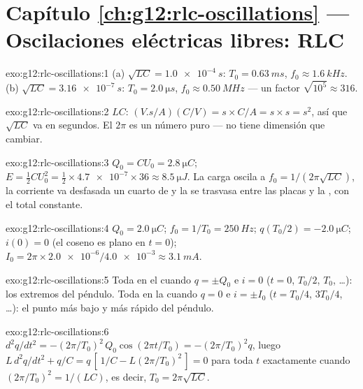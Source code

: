 \section*{Capítulo \ref{ch:g12:rlc-oscillations} --- Oscilaciones eléctricas libres: RLC}

\begin{solution}{exo:g12:rlc-oscillations:1}
(a) $\sqrt{LC} = \qty{1.0e-4}{s}$: $T_0 = \qty{0.63}{ms}$,
$f_0 \approx \qty{1.6}{kHz}$. (b) $\sqrt{LC} = \qty{3.16e-7}{s}$:
$T_0 = \qty{2.0}{\micro s}$, $f_0 \approx \qty{0.50}{MHz}$ --- un factor
$\sqrt{10^5} \approx 316$.
\end{solution}

\begin{solution}{exo:g12:rlc-oscillations:2}
$LC$: $(\unit{V.s/A})(\unit{C/V}) = \unit{s} \times \unit{C/A} =
\unit{s} \times \unit{s} = \unit{s^2}$, así que $\sqrt{LC}$ va en
segundos. El $2\pi$ es un número puro --- no tiene dimensión que
cambiar.
\end{solution}

\begin{solution}{exo:g12:rlc-oscillations:3}
$Q_0 = CU_0 = \qty{2.8}{\micro C}$;
$E = \tfrac12 CU_0^2 = \tfrac12 \times \num{4.7e-7} \times 36 \approx
\qty{8.5}{\micro J}$. La carga oscila a $f_0 = 1/(2\pi\sqrt{LC})$, la
corriente va desfasada un cuarto de  y la  se trasvasa
entre las placas y la , con el total constante.
\end{solution}

\begin{solution}{exo:g12:rlc-oscillations:4}
$Q_0 = \qty{2.0}{\micro C}$; $f_0 = 1/T_0 = \qty{250}{Hz}$;
$q(T_0/2) = \qty{-2.0}{\micro C}$; $i(0) = 0$ (el coseno es plano en
$t=0$); $I_0 = 2\pi \times \num{2.0e-6}/\num{4.0e-3} \approx
\qty{3.1}{mA}$.
\end{solution}

\begin{solution}{exo:g12:rlc-oscillations:5}
Toda en el  cuando $q = \pm Q_0$ e $i = 0$ ($t = 0$,
$T_0/2$, $T_0$, \dots): los extremos del péndulo. Toda en la 
cuando $q = 0$ e $i = \pm I_0$ ($t = T_0/4$, $3T_0/4$, \dots): el punto
más bajo y más rápido del péndulo.
\end{solution}

\begin{solution}{exo:g12:rlc-oscillations:6}
$d^2q/dt^2 = -(2\pi/T_0)^2\,Q_0\cos(2\pi t/T_0) = -(2\pi/T_0)^2 q$,
luego $L\,d^2q/dt^2 + q/C = q\,[\,1/C - L(2\pi/T_0)^2\,] = 0$ para toda
$t$ exactamente cuando $(2\pi/T_0)^2 = 1/(LC)$, es decir,
$T_0 = 2\pi\sqrt{LC}$.
\end{solution}

